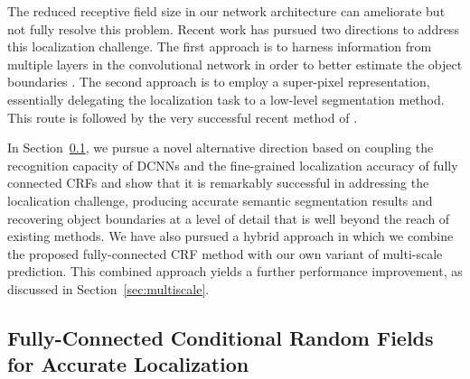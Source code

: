 The reduced receptive field size in our network architecture can ameliorate
but not fully resolve this problem. Recent work has pursued two directions to
address this localization challenge. The first approach is to harness
information from multiple layers in the convolutional network in order to
better estimate the object boundaries \citep{long2014fully, eigen2014predicting}. The second approach is
to employ a super-pixel representation, essentially delegating the
localization task to a low-level segmentation method. This route is followed
by the very successful recent method of \cite{mostajabi2014feedforward}.

In Section~\ref{sec:dense-crf}, we pursue a novel alternative direction based
on coupling the recognition capacity of DCNNs and the fine-grained
localization accuracy of fully connected CRFs and show that it is remarkably
successful in addressing the localication challenge, producing accurate
semantic segmentation results and recovering object boundaries at a level of
detail that is well beyond the reach of existing methods.  We have also
pursued a hybrid approach in which we combine the proposed fully-connected CRF
method with our own variant of multi-scale prediction. This combined approach
yields a further performance improvement, as discussed in
Section~\ref{sec:multiscale}.

\subsection{Fully-Connected Conditional Random Fields for Accurate Localization}
\label{sec:dense-crf}

